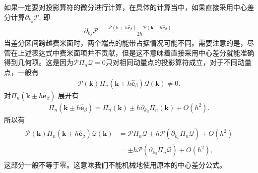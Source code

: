 \documentclass[10pt, oneside]{article}
\begin{document}
如果一定要对投影算符的微分进行计算，在具体的计算当中，如果直接采用中心差分计算\(\partial_{k_{\beta}} \mathcal{P}\), 即
\begin{align}
	\partial_{k_{\beta}} \mathcal{P} = \frac{\mathcal{P} \left(\bm{k} + h \hat{\bm{e }}_{\beta}\right) - \mathcal{P} \left(\bm{k} - h \hat{\bm{e }}_{\beta}\right)}{2h}.
\end{align}
当差分区间跨越费米面时，两个端点的能带占据情况可能不同。需要注意的是，尽管在上述表达式中费米面项并不贡献，但是这不意味着直接采用中心差分就能准确得到几何项。这是因为\(\mathcal{P} \Pi_{n} \mathcal{Q} = 0\)只对相同动量点的投影算符成立，对于不同动量点，一般有
\begin{align}
	\mathcal{P} \left(\bm{k}\right) \Pi_n \left(\bm k\pm h\hat{\bm e}_\beta\right) \mathcal{Q} \left( \bm{k}\right) \neq0.
\end{align}
对\(\Pi_n \left(\bm k\pm h\hat{\bm e}_\beta\right)\) 展开有
\begin{align}
	\Pi_n \left(\bm k\pm h\hat{\bm e}_\beta\right) = \Pi_{n } \left(\bm{k}\right) \pm h \partial_{k_{\beta}} \Pi_{n } \left(\bm{k}\right) + O \left(h^{2}\right).
\end{align}
所以有
\begin{align}
	\begin{split}
		\mathcal{P} \left(\bm{k}\right) \Pi_n \left(\bm k\pm h\hat{\bm e}_\beta\right) \mathcal{Q} \left(\bm{k}\right) & = \mathcal{P} \Pi_n \mathcal{Q} \pm h \mathcal{P} \left(\partial_{k_{\beta}} \Pi_{n } \mathcal{Q}\right) + O\left(h^{2}\right) \\
	& = \pm h \mathcal{P} \left(\partial_{k_{\beta}} \Pi_{n } \mathcal{Q}\right) + O\left(h^{2}\right),
	\end{split}
\end{align}
这部分一般不等于零。这意味我们不能机械地使用原本的中心差分公式。
\end{document}
